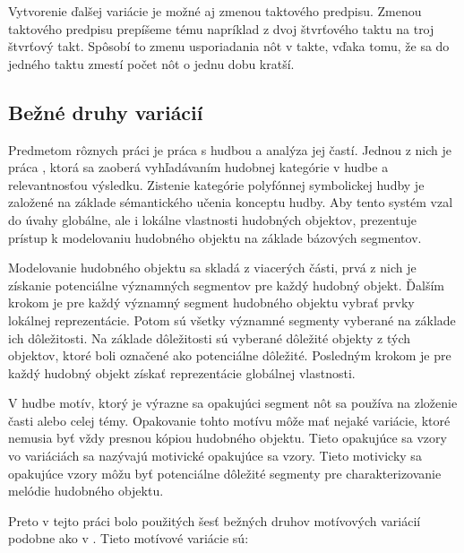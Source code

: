 Vytvorenie ďalšej variácie je možné aj zmenou taktového predpisu. Zmenou taktového predpisu prepíšeme tému napríklad z dvoj štvrťového taktu na troj štvrťový takt. Spôsobí to zmenu usporiadania nôt v takte, vďaka tomu, že sa do jedného taktu zmestí počet nôt o jednu dobu kratší.

\subsection{Bežné druhy variácií}
Predmetom rôznych práci je práca s hudbou a analýza jej častí. Jednou z nich je práca \cite{variationRelevance}, ktorá sa zaoberá vyhľadávaním hudobnej kategórie v hudbe a relevantnosťou výsledku. Zistenie kategórie polyfónnej symbolickej hudby je založené na základe sémantického učenia konceptu hudby. Aby tento systém vzal do úvahy globálne, ale i lokálne vlastnosti hudobných objektov, prezentuje prístup k modelovaniu hudobného objektu na základe bázových segmentov. 

Modelovanie hudobného objektu sa skladá z viacerých části, prvá z nich je získanie potenciálne významných segmentov pre každý hudobný objekt. Ďalším krokom je pre každý významný segment hudobného objektu vybrať prvky lokálnej reprezentácie. Potom sú všetky významné segmenty vyberané na základe ich dôležitosti. Na základe dôležitosti sú vyberané dôležité objekty z tých objektov, ktoré boli označené ako potenciálne dôležité. Posledným krokom je pre každý hudobný objekt získať reprezentácie globálnej vlastnosti.

V hudbe motív, ktorý je výrazne sa opakujúci segment nôt sa používa na zloženie časti alebo celej témy. Opakovanie tohto motívu môže mať nejaké variácie, ktoré nemusia byť vždy presnou kópiou hudobného objektu. Tieto opakujúce sa vzory vo variáciách sa nazývajú motivické opakujúce sa vzory. Tieto motivicky sa opakujúce vzory môžu byť potenciálne dôležité segmenty pre charakterizovanie melódie hudobného objektu.  

Preto v tejto práci bolo použitých šesť bežných druhov motívových variácií podobne ako v \cite{variationRelevance}. Tieto motívové variácie sú: 

